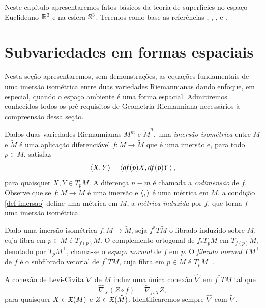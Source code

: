 Neste capítulo apresentaremos fatos básicos da teoria de superfícies no espaço Euclideano $\mathbb{R}^3$ e na esfera $\mathbb{S}^3$. Teremos como base as referências \cite{Carmo1987}, \cite{Meeks2012}, \cite{Nitsche2011}, \cite{Brendle2013} e \cite{Dajczer2019}.

\section{Subvariedades em formas espaciais}

Nesta seção apresentaremos, sem demonstrações, as equações fundamentais de uma imersão isométrica entre duas variedades Riemannianas dando enfoque, em especial, quando o espaço ambiente é uma forma espacial. Admitiremos conhecidos todos os pré-requisitos de Geometria Riemanniana necessários à compreensão dessa seção.

Dados duas variedades Riemannianas $M^m$ e $\tilde{M}^n$, uma \emph{imersão isométrica} entre $M$ e $\tilde{M}$ é uma aplicação diferenciável $f: M \rightarrow \tilde{M}$ que é uma imersão e, para todo $p \in M$. satisfaz
\begin{equation}\label{def-imersao}
\left\langle X,Y \right\rangle = \left\langle df(p) X,df(p) Y \right\rangle,	
\end{equation}
para quaisquer $X,Y \in T_p M$. A diferença $n-m$ é chamada a \emph{codimensão} de $f$. Observe que se $f: M \rightarrow \tilde{M}$ é uma imersão e $\left\langle , \right\rangle$ é uma métrica em $\tilde{M}$, a condição \eqref{def-imersao} define uma métrica em $M$, a \emph{métrica induzida} por $f$, que torna $f$ uma imersão isométrica.

\begin{definicao}
	Dado uma imersão isométrica $f: M \rightarrow \tilde{M}$, seja $f^* T \tilde{M}$ o fibrado induzido sobre $M$, cuja fibra em $p \in M$ é $T_{f(p)} \tilde{M}$. O complemento ortogonal de $f_* T_p M$ em $T_{f(p)} \tilde{M}$, denotado por $T_p M^\perp$, chama-se o \emph{espaço normal} de $f$ em $p$. O \emph{fibrado normal} $TM^\perp$ de $f$ é o subfibrado vetorial de $f^* T \tilde{M}$, cuja fibra em $p \in M$ é $T_p M^\perp$.
\end{definicao}

A conexão de Levi-Civita $\tilde{\nabla}$ de $\tilde{M}$ induz uma única conexão $\hat{\nabla}$ em $f^* T \tilde{M}$ tal que
\[ \hat{\nabla}_X (Z \circ f) = \tilde{\nabla}_{f_* X} Z, \]
para quaisquer $X \in \mathfrak{X}(M)$ e $Z \in \mathfrak{X}(\tilde{M})$. Identificaremos sempre $\hat{\nabla}$ com $\tilde{\nabla}$.

